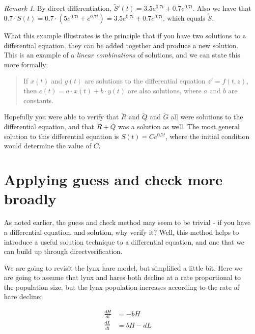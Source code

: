 \documentclass[
]{book}
\theoremstyle{definition}
\theoremstyle{definition}
\theoremstyle{definition}
\theoremstyle{remark}
\newtheorem*{remark}{Remark}
\begin{document}
\begin{remark}
{}By direct differentiation, \(\tilde{S}'(t) = 3.5e^{0.7t} + 0.7e^{0.7t}\). Also we have that \(0.7 \cdot \tilde{S}(t) = 0.7 \cdot (5e^{0.7t} + e^{0.7t}) = 3.5 e^{0.7t} + 0.7 e^{0.7t}\), which equals \(\tilde{S}\).
\end{remark}

What this example illustrates is the principle that if you have two solutions to a differential equation, they can be added together and produce a new solution. This is an example of a \emph{linear combinations} of solutions, and we can state this more formally:

\begin{quote}
If \(x(t)\) and \(y(t)\) are solutions to the differential equation \(z' = f(t,z)\), then \(c(t) = a \cdot x(t) + b \cdot y(t)\) are also solutions, where \(a\) and \(b\) are constants.
\end{quote}

Hopefully you were able to verify that \(\tilde{R}\) and \(\tilde{Q}\) and \(\tilde{G}\) all were solutions to the differential equation, and that \(\tilde{R} + \tilde{Q}\) was a solution as well. The most general solution to this differential equation is \(S(t)=Ce^{0.7t}\), where the initial condition would determine the value of \(C\).

\hypertarget{applying-guess-and-check-more-broadly}{%
\section{Applying guess and check more broadly}\label{applying-guess-and-check-more-broadly}}

As noted earlier, the guess and check method may seem to be trivial - if you have a differential equation, and solution, why verify it? Well, this method helps to introduce a useful solution technique to a differential equation, and one that we can build up through directverification.

We are going to revisit the lynx hare model, but simplified a little bit. Here we are going to assume that lynx and hares both decline at a rate proportional to the population size, but the lynx population increases according to the rate of hare decline:

\begin{align}
\frac{dH}{dt} &= -b H  \\
\frac{dL}{dt} & = b H  - d L
\end{align}
\end{document}
